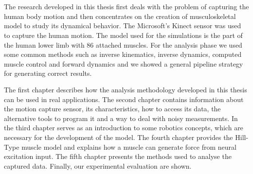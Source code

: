 \thispagestyle{empty}
\clearpage\mbox{}
\thispagestyle{empty}
\clearpage

\section*{\texorpdfstring{}{}}

\en
The research developed in this thesis first deals with the problem of capturing the human body motion and then concentrates on the creation of musculoskeletal model to study its dynamical behavior. The Microsoft's Kinect sensor was used to capture the human motion. The model used for the simulations is the part of the human lower limb with 86 attached muscles. For the analysis phase we used some common methods such as inverse kinematics, inverse dynamics, computed muscle control and forward dynamics and we showed a general pipeline strategy for generating correct results.

The first chapter describes how the analysis methodology developed in this thesis can be used in real applications. The second chapter contains information about the motion capture sensor, its characteristics, how to access its data, the alternative tools to program it and a way to deal with noisy measurements. In the third chapter serves as an introduction to some robotics concepts, which are necessary for the development of the model. The fourth chapter provides the Hill-Type muscle model and explains how a muscle can generate force from neural excitation input. The fifth chapter presents the methods used to analyse the captured data. Finally, our experimental evaluation are shown.
\gr

\vfill

\paragraph{\textbf{}}

\thispagestyle{empty}
\clearpage\mbox{}
\thispagestyle{empty}
